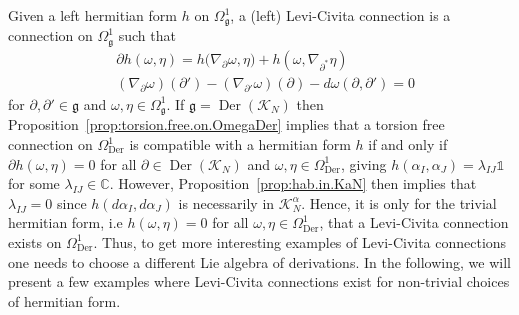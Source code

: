 \documentclass{amsart}
\newcommand{\complex}{\mathbb{C}}
\newcommand{\paraa}[1]{\big(#1\big)}
\theoremstyle{definition}
\theoremstyle{remark}
\numberwithin{equation}{section}
\newcommand{\K}{\mathcal{K}}
\renewcommand{\mid}{\mathds{1}}
\newcommand{\KN}{\K_N}
\newcommand{\KaN}{\K^\alpha_N}
\renewcommand{\d}{\partial}
\newcommand{\Der}{\operatorname{Der}}
\newcommand{\g}{\mathfrak{g}}
\newcommand{\Omegaoneg}{\Omega^1_{\g}}
\begin{document}
Given a left hermitian form $h$ on $\Omegaoneg$, a (left) Levi-Civita connection
is a connection on $\Omegaoneg$ such that
\begin{align*}
  &\d h(\omega,\eta) = h\paraa{\nabla_{\d}\omega,\eta} + h(\omega,\nabla_{\d^\ast}\eta)\\
  &(\nabla_{\d}\omega)(\d')-(\nabla_{\d'}\omega)(\d)-d\omega(\d,\d') = 0
\end{align*}
for $\d,\d'\in\g$ and $\omega,\eta\in\Omegaoneg$. If $\g=\Der(\KN)$
then Proposition~\ref{prop:torsion.free.on.OmegaDer} implies that a
torsion free connection on $\Omega^1_{\Der}$ is compatible with a
hermitian form $h$ if and only if $\d h(\omega,\eta)=0$ for all
$\d\in\Der(\KN)$ and $\omega,\eta\in\Omega^1_{\Der}$, giving
$h(\alpha_I,\alpha_J)=\lambda_{IJ}\mid$ for some
$\lambda_{IJ}\in\complex$. However, Proposition~\ref{prop:hab.in.KaN}
then implies that $\lambda_{IJ}=0$ since $h(d\alpha_I,d\alpha_J)$ is
necessarily in $\KaN$. Hence, it is only for the trivial hermitian
form, i.e $h(\omega,\eta)=0$ for all $\omega,\eta\in\Omega^1_{\Der}$,
that a Levi-Civita connection exists on $\Omega^1_{\Der}$. Thus, to
get more interesting examples of Levi-Civita connections one needs to
choose a different Lie algebra of derivations. In the following, we
will present a few examples where Levi-Civita connections exist for
non-trivial choices of hermitian form.
\end{document}

